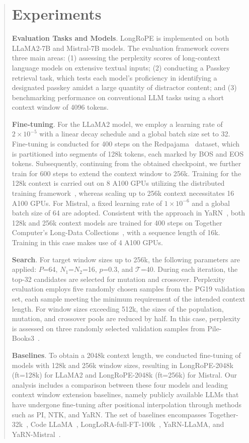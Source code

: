 \begin{abstract}
 \section{Experiments}

\textbf{Evaluation Tasks and Models}. LongRoPE is implemented on both LLaMA2-7B and Mistral-7B models. The evaluation framework covers three main areas: (1) assessing the perplexity scores of long-context language models on extensive textual inputs; (2) conducting a Passkey retrieval task, which tests each model’s proficiency in identifying a designated passkey amidst a large quantity of distractor content; and (3) benchmarking performance on conventional LLM tasks using a short context window of 4096 tokens.

\textbf{Fine-tuning}. For the LLaMA2 model, we employ a learning rate of $2 \times 10^{-5}$ with a linear decay schedule and a global batch size set to 32. Fine-tuning is conducted for 400 steps on the Redpajama~\cite{redpajama} dataset, which is partitioned into segments of 128k tokens, each marked by BOS and EOS tokens. Subsequently, continuing from the obtained checkpoint, we further train for 600 steps to extend the context window to 256k. Training for the 128k context is carried out on 8 A100 GPUs utilizing the distributed training framework~\cite{cube}, whereas scaling up to 256k context necessitates 16 A100 GPUs. For Mistral, a fixed learning rate of $1 \times 10^{-6}$ and a global batch size of 64 are adopted. Consistent with the approach in YaRN~\cite{yarn}, both 128k and 256k context models are trained for 400 steps on Together Computer's Long-Data Collections~\cite{mistraldata}, with a sequence length of 16k. Training in this case makes use of 4 A100 GPUs.

\textbf{Search}. For target window sizes up to 256k, the following parameters are applied: $P$=64, $N_1$=$N_2$=16, $p$=0.3, and $\mathcal{T}$=40. During each iteration, the top-32 candidates are selected for mutation and crossover. Perplexity evaluation employs five randomly chosen samples from the PG19 validation set, each sample meeting the minimum requirement of the intended context length. For window sizes exceeding 512k, the sizes of the population, mutation, and crossover pools are reduced by half. In this case, perplexity is assessed on three randomly selected validation samples from Pile-Books3~\cite{pile}.

\textbf{Baselines}. To obtain a 2048k context length, we conducted fine-tuning of models with 128k and 256k window sizes, resulting in LongRoPE-2048k (ft=128k) for LLaMA2 and LongRoPE-2048k (ft=256k) for Mistral. Our analysis includes a comparison between these four models and leading context window extension baselines, namely publicly available LLMs that have undergone fine-tuning after positional interpolation through methods such as PI, NTK, and YaRN. The set of baselines encompasses Together-32k~\cite{together}, Code LLaMA~\cite{codellama}, LongLoRA-full-FT-100k~\cite{longlora}, YaRN-LLaMA, and YaRN-Mistral~\cite{yarn}.


\end{abstract}
